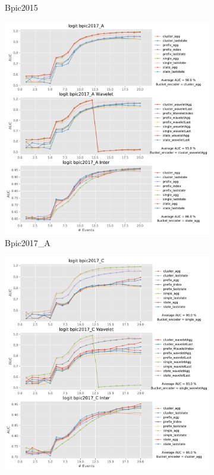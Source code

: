 \documentclass[twoside,11pt]{Latex/Classes/PhDthesisPSnPDF}
\begin{document}
\begin{figure}[!htbp]
\begin{subfigure}{0.48\textwidth}
		\caption{Bpic2015} \label{fig:b151i}
	\end{subfigure}	
	\begin{subfigure}{0.48\textwidth}
		\includegraphics[width=\linewidth]{images/inter/logit/bpic2017_A.pdf}
		\caption{Bpic2017\_A} \label{fig:b17ai}
	\end{subfigure}\hspace*{\fill}
	\begin{subfigure}{0.48\textwidth}
		\includegraphics[width=\linewidth]{images/inter/logit/bpic2017_C.pdf}

\end{subfigure}
\end{figure}
\end{document}
